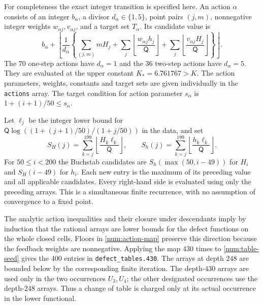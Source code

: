For completeness the exact integer transition is specified here.
An action $\alpha$ consists of an integer $b_\alpha$, a divisor
$d_\alpha\in\{1,5\}$, point pairs $(j,m)$, nonnegative integer
weights $w_{\alpha j},v_{\alpha j}$, and a target set $T_\alpha$.
Its candidate value is
\begin{equation}
 b_\alpha+\left\lfloor\frac1{d_\alpha}
 \left\{\sum_{(j,m)}mH_j+
 \sum_j\left\lfloor\frac{w_{\alpha j}h_j}{\mathsf Q}\right\rfloor+
 \sum_j\left\lfloor\frac{v_{\alpha j}H_j}{\mathsf Q}\right\rfloor
 \right\}\right\rfloor.
 \label{num:action-map}
\end{equation}
The $70$ one-step actions have $d_\alpha=1$ and the $36$ two-step
actions have $d_\alpha=5$.  They are evaluated at the upper
constant $K_*=6.761767>K$.  The action parameters, weights,
constants and target sets are given individually in the
\texttt{actions} array.  The target condition for action parameter
$s_\alpha$ is $1+(i+1)/50\le s_\alpha$.

Let $\ell_j$ be the integer lower bound for
$\mathsf Q\log((1+(j+1)/50)/(1+j/50))$ in the data, and set
\[
 S_H(j)=\sum_{k=j}^{199}\left\lfloor\frac{H_k\ell_k}{\mathsf Q}\right\rfloor,
 \qquad
 S_h(j)=\sum_{k=j}^{199}\left\lfloor\frac{h_k\ell_k}{\mathsf Q}\right\rfloor.
\]
For $50\le i<200$ the Buchstab candidates are
$S_h(\max(50,i-49))$ for $H_i$ and $S_H(i-49)$ for $h_i$.
Each new entry is the maximum of its preceding value and all
applicable candidates.  Every right-hand side is evaluated using
only the preceding arrays.  This is a simultaneous finite
recurrence, with no assumption of convergence to a fixed point.

The analytic action inequalities and their closure under descendants
imply by induction that the rational arrays are lower bounds for
the defect functions on the whole closed cells.  Floors in
\eqref{num:action-map} preserve this direction because the
feedback weights are nonnegative.  Applying the map $430$ times
to \eqref{num:table-seed} gives the $400$ entries in
\texttt{defect\_tables.430}.  The arrays at depth $248$ are
bounded below by the corresponding finite iteration.  The
depth-$430$ arrays are used only in the two occurrences
$U_3,U_4$; the other designated occurrences use the depth-$248$
arrays.  Thus a change of table is charged only at its actual
occurrence in the lower functional.

